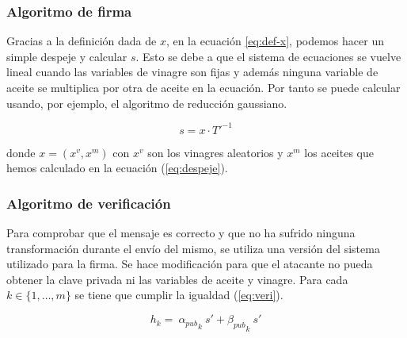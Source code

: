 \subsubsection{Algoritmo de firma}

Gracias a la definición dada de $x$, en la ecuación \ref{eq:def-x}, podemos hacer un simple despeje y calcular $s$. Esto se debe a que el sistema de ecuaciones se vuelve lineal cuando las variables de vinagre son fijas y además ninguna variable de aceite se multiplica por otra de aceite en la ecuación. Por tanto se puede calcular usando, por ejemplo, el algoritmo de reducción gaussiano.

\begin{equation}\label{eq:firma}
	s = x \cdot T'^{-1}
\end{equation}

donde $x = (x^v, x^m)$ con $x^v$ son los vinagres aleatorios y $x^m$ los aceites que hemos calculado en la ecuación (\ref{eq:despeje}).




\subsubsection{Algoritmo de verificación}

Para comprobar que el mensaje es correcto y que no ha sufrido ninguna transformación durante el envío del mismo, se utiliza una versión del sistema utilizado para la firma. Se hace modificación para que el atacante no pueda obtener la clave privada ni las variables de aceite y vinagre. Para cada $k \in  \{1,\dots, m\}$ se tiene que cumplir la igualdad (\ref{eq:veri}).


\begin{equation}\label{eq:veri}
	h_k = \ {\alpha_{pub}}_k \ s' + {\beta_{pub}}_{k} \ s'
\end{equation}


